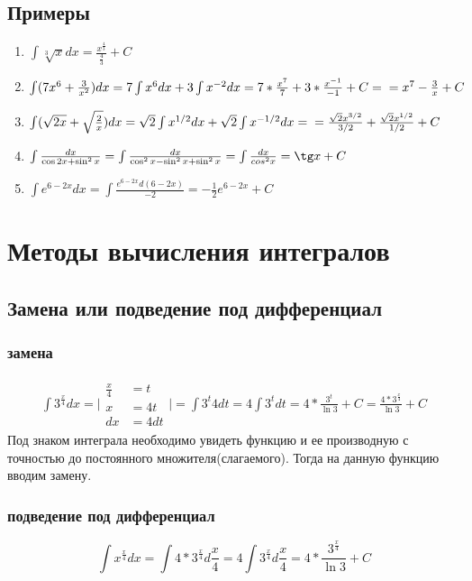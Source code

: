 \documentclass[12pt,a4paper]{article}
\begin{document}
\subsection{Примеры}
\begin{enumerate}[label=(\roman*), leftmargin=*, itemsep=0.4ex, before={\everymath{\displaystyle}}]%
\item{
$\int \sqrt[3]{x} dx = \frac{x^{\frac{4}{3}}}{\frac{4}{3}} + C$
}
\item{
$
\int (7x^6 + \frac{3}{x^2})dx = 7 \int x^6 dx + 3 \int x^{-2} dx
= 7 * \frac{x^7}{7} + 3 * \frac{x^{-1}}{-1} + C =\\ = x^7 - \frac{3}{x} + C
$
}
\item{
$
\int (\sqrt{2x} + \sqrt{\frac{2}{x}})dx = \sqrt{2} \int x^{1/2}dx +
\sqrt{2} \int x^{-1/2}dx =\\ = \frac{\sqrt{2} x^{3/2}}{3/2} +
\frac{\sqrt{2} x^{1/2}}{1/2} + C
$
}
\item{
$\int \frac{dx}{\cos 2x + \sin^2 x} =
\int \frac{dx}{\cos^2 x - \sin^2 x + \sin^2 x} =
\int \frac{dx}{cos^2 x} =
\tg x + C$
}
\item{
$
\int e^{6 - 2x} dx =
\int \frac{e^{6 - 2x}d(6 - 2x)}{-2} =
-\frac{1}{2} e^{6 - 2x} + C
$
}
\end{enumerate}
\clearpage
\section{Методы вычисления интегралов}
\subsection{Замена или подведение под дифференциал}
\subsubsection{замена}
\begin{align*}
\int 3^{\frac{x}{4}} dx = \Bigg|
\begin{split}
\frac{x}{4} & = t \\
x & = 4t \\
dx & = 4dt
\end{split}
\Bigg| = \int 3^t 4dt = 4 \int 3^t dt = 4 * \frac{3^t}{\ln 3} + C =
\frac{4 * 3^{\frac{x}{4}}}{\ln 3} + C
\end{align*}
Под знаком интеграла необходимо увидеть функцию и ее производную
с точностью до постоянного множителя(слагаемого).
Тогда на данную функцию вводим замену.
\subsubsection{подведение под дифференциал}
\[
\int x^{\frac{x}{4}} dx = \int 4 * 3^{\frac{x}{4}} d\frac{x}{4}
= 4 \int 3^{\frac{x}{4}} d\frac{x}{4} =
4 * \frac{3^{\frac{x}{4}}}{\ln 3} + C
\]
\end{document}
